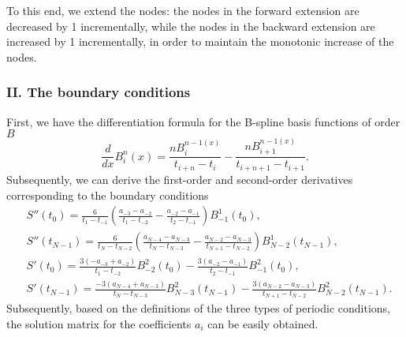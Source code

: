 \documentclass[a4paper]{article}
\begin{document}
To this end, we extend the nodes: the nodes in the forward extension are decreased by 1 incrementally, while the nodes in the backward extension are increased by 1 incrementally, in order to maintain the monotonic increase of the nodes.

\subsubsection*{II. The boundary conditions}

First, we have the differentiation formula for the B-spline basis functions of order \( B \)
\[
\frac{d}{dx}B_i^n(x)=\frac{nB_i^{n-1(x)}}{t_{i+n}-t_i}-\frac{nB_{i+1}^{n-1(x)}}{t_{i+n+1}-t_{i+1}}.
\]
Subsequently, we can derive the first-order and second-order derivatives corresponding to the boundary conditions
\begin{align*}
    &S''(t_0)=\frac{6}{t_1-t_{-1}}\left( \frac{a_{-3}-a_{-2}}{t_1-t_{-2}}- \frac{a_{-2}-a_{-1}}{t_2-t_{-1}}\right)B^1_{-1}(t_0),\\
    &S''(t_{N-1})=\frac{6}{t_N-t_{N-2}}\left( \frac{a_{N-4}-a_{N-3}}{t_N-t_{N-3}}- \frac{a_{N-2}-a_{N-3}}{t_{N+1}-t_{N-2}}\right)B^1_{N-2}(t_{N-1}),\\
    &S'(t_0)=\frac{3(-a_{-3}+a_{-2})}{t_1-t_{-2}}B^2_{-2}(t_0)-\frac{3(a_{-2}-a_{-1})}{t_2-t_{-1}}B^2_{-1}(t_0),\\
    &S'(t_{N-1})=\frac{-3(a_{N-4}+a_{N-3})}{t_N-t_{N-3}}B^2_{N-3}(t_{N-1})-\frac{3(a_{N-2}-a_{N-3})}{t_{N+1}-t_{N-2}}B^2_{N-2}(t_{N-1}).
\end{align*}
Subsequently, based on the definitions of the three types of periodic conditions, the solution matrix for the coefficients \(a_i\) can be easily obtained.


\subsection*{  }
\printbibliography
\end{document}
